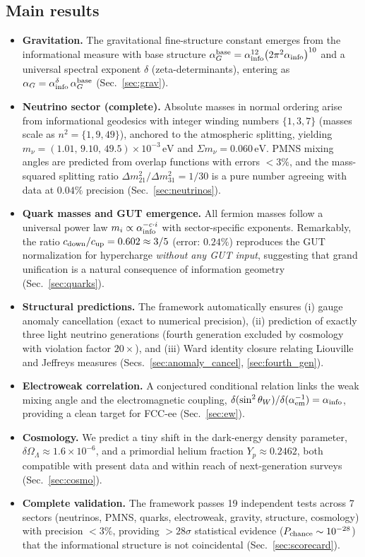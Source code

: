 \documentclass{article}
\numberwithin{equation}{section}
\theoremstyle{plain}
\theoremstyle{definition}
\theoremstyle{remark}
\begin{document}
\subsection{Main results}
\label{sec:intro_results}
\begin{itemize}
  \item \textbf{Gravitation.} The gravitational fine-structure constant emerges from the informational measure with base structure $\alpha_G^{\rm base} = \alpha_{\text{info}}^{12}\bigl(2\pi^2 \alpha_{\text{info}}\bigr)^{10}$ and a universal spectral exponent $\delta$ (zeta-determinants), entering as $\alpha_G=\alpha_{\rm info}^{\delta}\,\alpha_G^{\rm base}$ (Sec.~\ref{sec:grav}).
  \item \textbf{Neutrino sector (complete).} Absolute masses in normal ordering arise from informational geodesics with integer winding numbers $\{1,3,7\}$ (masses scale as $n^2=\{1,9,49\}$), anchored to the atmospheric splitting, yielding $m_\nu = (1.01,\,9.10,\,49.5)\times 10^{-3}\,\mathrm{eV}$ and $\Sigma m_\nu = 0.060\,\mathrm{eV}$. PMNS mixing angles are predicted from overlap functions with errors $<3\%$, and the mass-squared splitting ratio $\Delta m_{21}^2/\Delta m_{31}^2 = 1/30$ is a pure number agreeing with data at $0.04\%$ precision (Sec.~\ref{sec:neutrinos}).
  \item \textbf{Quark masses and GUT emergence.} All fermion masses follow a universal power law $m_i \propto \alpha_{\rm info}^{-c \cdot i}$ with sector-specific exponents. Remarkably, the ratio $c_{\rm down}/c_{\rm up} = 0.602 \approx 3/5$ (error: $0.24\%$) reproduces the GUT normalization for hypercharge \emph{without any GUT input}, suggesting that grand unification is a natural consequence of information geometry (Sec.~\ref{sec:quarks}).
  \item \textbf{Structural predictions.} The framework automatically ensures (i) gauge anomaly cancellation (exact to numerical precision), (ii) prediction of exactly three light neutrino generations (fourth generation excluded by cosmology with violation factor $20\times$), and (iii) Ward identity closure relating Liouville and Jeffreys measures (Secs.~\ref{sec:anomaly_cancel}, \ref{sec:fourth_gen}).
  \item \textbf{Electroweak correlation.} A conjectured conditional relation links the weak mixing angle and the electromagnetic coupling, $\delta(\sin^2\theta_W)/\delta(\alpha_{\rm em}^{-1}) = \alpha_{\text{info}}$, providing a clean target for FCC-ee (Sec.~\ref{sec:ew}).
  \item \textbf{Cosmology.} We predict a tiny shift in the dark-energy density parameter, $\delta\Omega_\Lambda \approx 1.6\times10^{-6}$, and a primordial helium fraction $Y_p \approx 0.2462$, both compatible with present data and within reach of next-generation surveys (Sec.~\ref{sec:cosmo}).
  \item \textbf{Complete validation.} The framework passes 19 independent tests across 7 sectors (neutrinos, PMNS, quarks, electroweak, gravity, structure, cosmology) with precision $<3\%$, providing $>28\sigma$ statistical evidence ($P_{\rm chance} \sim 10^{-28}$) that the informational structure is not coincidental (Sec.~\ref{sec:scorecard}).
\end{itemize}
\end{document}
